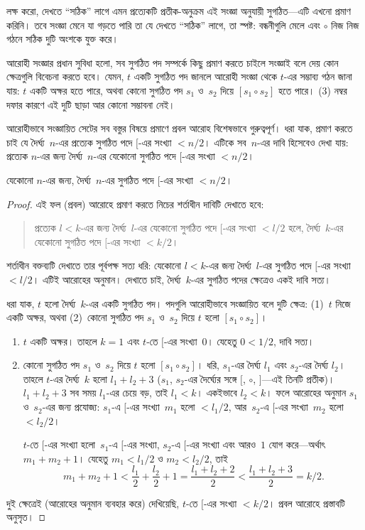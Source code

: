 \documentclass[../../../include/open-logic-section]{subfiles}
\begin{document}
লক্ষ করো, দেখতে ``সঠিক'' লাগে এমন প্রত্যেকটি প্রতীক-অনুক্রম
এই সংজ্ঞা অনুযায়ী সুগঠিত—এটি এখনো প্রমাণ করিনি। তবে
সংজ্ঞা মেনে যা গড়তে পারি তা যে দেখতে ``সঠিক'' লাগে, তা
স্পষ্ট: বন্ধনীগুলি মেলে এবং $\circ$ নিজ নিজ গঠনে সঠিক
দুটি অংশকে যুক্ত করে।

আরোহী সংজ্ঞার প্রধান সুবিধা হলো, সব সুগঠিত পদ সম্পর্কে
কিছু প্রমাণ করতে চাইলে সংজ্ঞাই বলে দেয় কোন ক্ষেত্রগুলি
বিবেচনা করতে হবে। যেমন, $t$ একটি সুগঠিত পদ জানলে
আরোহী সংজ্ঞা থেকে $t$-এর সম্ভাব্য গঠন জানা যায়: $t$
একটি অক্ষর হতে পারে, অথবা কোনো সুগঠিত পদ $s_1$ ও~$s_2$
দিয়ে $[s_1 \circ s_2]$ হতে পারে। (3) নম্বর দফার কারণে
এই দুটি ছাড়া আর কোনো সম্ভাবনা নেই।

আরোহীভাবে সংজ্ঞায়িত সেটের সব বস্তুর বিষয়ে প্রমাণে
প্রবল আরোহ বিশেষভাবে গুরুত্বপূর্ণ। ধরা যাক, প্রমাণ করতে
চাই যে দৈর্ঘ্য~$n$-এর প্রত্যেক সুগঠিত পদে $[$-এর সংখ্যা
$< n/2$। এটিকে সব~$n$-এর দাবি হিসেবেও দেখা যায়:
প্রত্যেক $n$-এর জন্য দৈর্ঘ্য~$n$-এর যেকোনো সুগঠিত পদে
$[$-এর সংখ্যা $< n/2$।

\begin{prop}
  যেকোনো $n$-এর জন্য, দৈর্ঘ্য~$n$-এর সুগঠিত পদে
  $[$-এর সংখ্যা $< n/2$।
\end{prop}

\begin{proof}
এই ফল (প্রবল) আরোহে প্রমাণ করতে নিচের শর্তাধীন দাবিটি
দেখাতে হবে:
\begin{quote}
  প্রত্যেক $l < k$-এর জন্য দৈর্ঘ্য~$l$-এর যেকোনো সুগঠিত
  পদে $[$-এর সংখ্যা $< l/2$ হলে, দৈর্ঘ্য~$k$-এর যেকোনো
  সুগঠিত পদে $[$-এর সংখ্যা $< k/2$।
\end{quote}
শর্তাধীন বক্তব্যটি দেখাতে তার পূর্বপক্ষ সত্য ধরি: যেকোনো
$l<k$-এর জন্য দৈর্ঘ্য~$l$-এর সুগঠিত পদে $[$-এর সংখ্যা
$< l/2$। এটিই আরোহের অনুমান। দেখাতে চাই, দৈর্ঘ্য~$k$-এর
সুগঠিত পদের ক্ষেত্রেও একই দাবি সত্য।

ধরা যাক, $t$ হলো দৈর্ঘ্য~$k$-এর একটি সুগঠিত পদ। পদগুলি
আরোহীভাবে সংজ্ঞায়িত বলে দুটি ক্ষেত্র: (1)~$t$ নিজে একটি
অক্ষর, অথবা (2)~কোনো সুগঠিত পদ $s_1$ ও~$s_2$ দিয়ে
$t$ হলো $[s_1 \circ s_2]$।
\begin{enumerate}
\item $t$ একটি অক্ষর। তাহলে $k = 1$ এবং $t$-তে
$[$-এর সংখ্যা~$0$। যেহেতু $0 < 1/2$, দাবি সত্য।
\item কোনো সুগঠিত পদ $s_1$ ও~$s_2$ দিয়ে $t$ হলো
  $[s_1 \circ s_2]$। ধরি, $s_1$-এর দৈর্ঘ্য $l_1$ এবং
  $s_2$-এর দৈর্ঘ্য $l_2$। তাহলে $t$-এর দৈর্ঘ্য~$k$
  হলো $l_1+l_2+3$ ($s_1$, $s_2$-এর দৈর্ঘ্যের সঙ্গে
  $[$, $\circ$, $]$—এই তিনটি প্রতীক)। $l_1+l_2+3$
  সব সময় $l_1$-এর চেয়ে বড়, তাই $l_1 < k$। একইভাবে
  $l_2 < k$। ফলে আরোহের অনুমান $s_1$ ও~$s_2$-এর
  জন্য প্রযোজ্য: $s_1$-এ $[$-এর সংখ্যা~$m_1$ হলো
  $< l_1/2$, আর~$s_2$-এ $[$-এর সংখ্যা~$m_2$ হলো
  $< l_2/2$।

  $t$-তে $[$-এর সংখ্যা হলো~$s_1$-এ $[$-এর সংখ্যা,
  $s_2$-এ $[$-এর সংখ্যা এবং আরও~$1$ যোগ করে—অর্থাৎ
  $m_1 + m_2 + 1$। যেহেতু $m_1 < l_1/2$ ও $m_2 < l_2/2$,
  তাই
  \[
  m_1 + m_2 + 1 < \frac{l_1}{2} + \frac{l_2}{2} + 1 = \frac{l_1+l_2+2}{2} < \frac{l_1+l_2+3}{2} = k/2.
  \]
\end{enumerate}
দুই ক্ষেত্রেই (আরোহের অনুমান ব্যবহার করে) দেখিয়েছি,
$t$-তে $[$-এর সংখ্যা $< k/2$। প্রবল আরোহে প্রস্তাবটি
অনুসৃত।
\end{proof}
\end{document}
